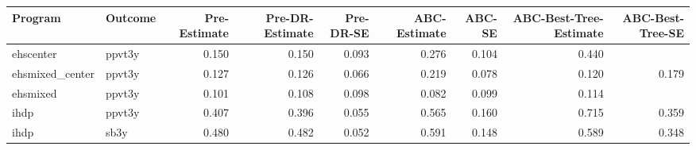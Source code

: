 \begin{table}[ht]
\centering
\begin{tabular}{llrrrrrrr}
  \hline
Program & Outcome & Pre-Estimate & Pre-DR-Estimate & Pre-DR-SE & ABC-Estimate & ABC-SE & ABC-Best-Tree-Estimate & ABC-Best-Tree-SE \\ 
  \hline
ehscenter & ppvt3y & 0.150 & 0.150 & 0.093 & 0.276 & 0.104 & 0.440 &  \\ 
  ehsmixed\_center & ppvt3y & 0.127 & 0.126 & 0.066 & 0.219 & 0.078 & 0.120 & 0.179 \\ 
  ehsmixed & ppvt3y & 0.101 & 0.108 & 0.098 & 0.082 & 0.099 & 0.114 &  \\ 
  ihdp & ppvt3y & 0.407 & 0.396 & 0.055 & 0.565 & 0.160 & 0.715 & 0.359 \\ 
  ihdp & sb3y & 0.480 & 0.482 & 0.052 & 0.591 & 0.148 & 0.589 & 0.348 \\ 
   \hline
\end{tabular}
\end{table}
